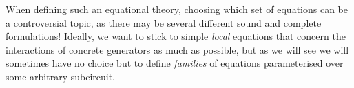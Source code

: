 When defining such an equational theory, choosing which set of equations can be
a controversial topic, as there may be several different sound and complete
formulations!
Ideally, we want to stick to simple \emph{local} equations that concern the
interactions of concrete generators as much as possible, but as we will see
we will sometimes have no choice but to define \emph{families} of equations
parameterised over some arbitrary subcircuit.




